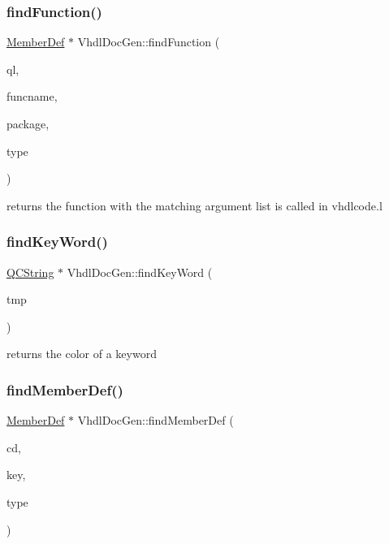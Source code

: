 \subsubsection{\texorpdfstring{findFunction()}{findFunction()}}
{\footnotesize\ttfamily \mbox{\hyperlink{class_member_def}{Member\+Def}} $\ast$ Vhdl\+Doc\+Gen\+::find\+Function (\begin{DoxyParamCaption}\item[{const \mbox{\hyperlink{class_q_list}{Q\+List}}$<$ \mbox{\hyperlink{struct_argument}{Argument}} $>$ \&}]{ql,  }\item[{const \mbox{\hyperlink{class_q_c_string}{Q\+C\+String}} \&}]{funcname,  }\item[{const \mbox{\hyperlink{class_q_c_string}{Q\+C\+String}} \&}]{package,  }\item[{bool}]{type }\end{DoxyParamCaption})\hspace{0.3cm}{\ttfamily [static]}}

returns the function with the matching argument list is called in vhdlcode.\+l \mbox{\label{class_vhdl_doc_gen_a0338d8a473042e0ce824cd33def75544}} 
\subsubsection{\texorpdfstring{findKeyWord()}{findKeyWord()}}
{\footnotesize\ttfamily \mbox{\hyperlink{class_q_c_string}{Q\+C\+String}} $\ast$ Vhdl\+Doc\+Gen\+::find\+Key\+Word (\begin{DoxyParamCaption}\item[{const \mbox{\hyperlink{class_q_c_string}{Q\+C\+String}} \&}]{tmp }\end{DoxyParamCaption})\hspace{0.3cm}{\ttfamily [static]}}

returns the color of a keyword \mbox{\label{class_vhdl_doc_gen_a69d1010e9addd89076e51cb78ddf029f}} 
\subsubsection{\texorpdfstring{findMemberDef()}{findMemberDef()}}
{\footnotesize\ttfamily \mbox{\hyperlink{class_member_def}{Member\+Def}} $\ast$ Vhdl\+Doc\+Gen\+::find\+Member\+Def (\begin{DoxyParamCaption}\item[{\mbox{\hyperlink{class_class_def}{Class\+Def}} $\ast$}]{cd,  }\item[{const \mbox{\hyperlink{class_q_c_string}{Q\+C\+String}} \&}]{key,  }\item[{Member\+List\+Type}]{type }\end{DoxyParamCaption})\hspace{0.3cm}{\ttfamily [static]}}

